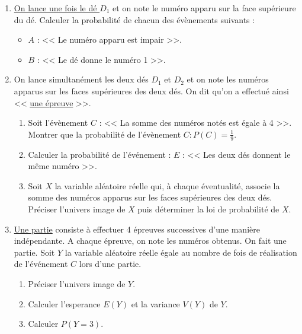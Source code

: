       \begin{enumerate}
            \item \underline{On lance une fois le d\'e $D_1$} et on note le num\'ero apparu sur la face sup\'erieure du d\'e.
                  Calculer la probabilit\'e de chacun des \'ev\`enements suivants :
                  \begin{itemize}
                        \item $A$ : << Le num\'ero apparu est impair >>.
                        \item $B$ : << Le d\'e donne le num\'ero 1 >>.
                  \end{itemize}
            \item On lance simultan\'ement les deux d\'es $D_1$ et $D_2$ et on note les num\'eros apparus sur les
                  faces sup\'erieures des deux d\'es.
                  On dit qu'on a effectu\'e ainsi << \underline{une \'epreuve} >>.
                  \begin{enumerate}
                        \item Soit l'\'ev\`enement $C$ : << La somme des num\'eros not\'es est \'egale \`a 4 >>.
                              Montrer que la probabilit\'e de l'\'ev\`enement $C : P(C) = \frac{1}{9}$.
                        \item Calculer la probabilité de l’événement :
                              $E$ : << Les deux d\'es donnent le m\^eme num\'ero >>.
                        \item Soit $X$ la variable aléatoire réelle qui, à chaque éventualité, 
                              associe la somme des numéros apparus sur les faces supérieures des deux dés.
                              Préciser l’univers image de $X$ puis déterminer la loi de probabilité de $X$.
                  \end{enumerate}
            \item \underline{Une partie} consiste \`a effectuer 4 \'epreuves successives d'une mani\`ere ind\'ependante.
                  A chaque épreuve, on note les numéros obtenus. On fait une partie. Soit $Y$ la variable aléatoire réelle 
                  égale au nombre de fois de réalisation de l’événement $C$ lors d’une partie.
                  \begin{enumerate}
                        \item Pr\'eciser l'univers image de $Y$.
                        \item Calculer l'esperance $E(Y)$ et la variance $V(Y)$ de $Y$.
                        \item Calculer $P(Y = 3)$.
                  \end{enumerate}
      \end{enumerate}
